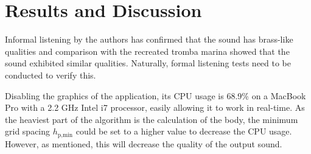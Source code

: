     \section{Results and Discussion}\label{sec:resDisc}
    Informal listening by the authors has confirmed that the sound has brass-like qualities and comparison with the recreated tromba marina showed that the sound exhibited similar qualities. Naturally, formal listening tests need to be conducted to verify this.
    
    Disabling the graphics of the application, its CPU usage is 68.9\% on a MacBook Pro with a 2.2 GHz Intel i7 processor, easily allowing it to work in real-time. As the heaviest part of the algorithm is the calculation of the body, the minimum grid spacing $h_{\text{p},\text{min}}$ could be set to a higher value to decrease the CPU usage. However, as mentioned, this will decrease the quality of the output sound.
    
